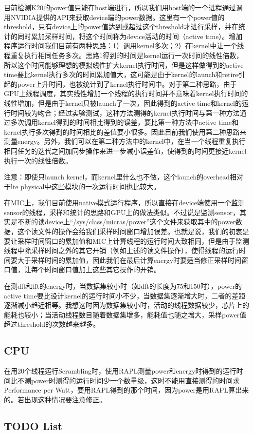 \documentclass[titlepage]{article}
\numberwithin{figure}{section}
\numberwithin{equation}{section}
\begin{document}
目前检测K20的power值只能在host端进行，所以我们用host端的一个进程通过调用NVIDIA提供的API来获取device端的power数据。这里有一个power值的threshold，只有device上的power值达到或超过这个threshold才进行采样，并在统计的同时累加采样时间，将这个时间称为device活动的时间（active time）。增加程序运行时间我们目前有两种思路：1）调用kernel多次；2）在kernel中让一个线程重复执行相同任务多次。思路1得到的时间是kernel运行一次时间的线性倍数，所以这个时间能够理想的模拟线性扩大kernel执行时间，但是这样做得到的active time要比kernel执行多次的时间累加值大，这可能是由于kernel的launch和retire引起的power上升时间，也被统计到了kernel执行时间中。对于第二种思路，由于GPU上线程调度，其实线性增加一个线程的执行时间并不意味着kernel执行时间的线性增加，但是由于kernel只被launch了一次，因此得到的active time和kernel的运行时间较为吻合；经过实验测试，这种方法测得的kernel执行时间与第一种方法通过多次调用kernel得到的时间相比得到的误差，要比第一种方法中active time和kernel执行多次得到的时间相比的差值要小很多。因此目前我们使用第二种思路来测量energy。另外，我们可以在第二种方法中的kernel中，在当一个线程重复执行相同任务的迭代之间加同步操作来进一步减小误差值，使得到的时间更接近kernel执行一次的线性倍数。

注意：即使只launch kernel，而kernel里什么也不做，这个launch的overhead相对于lte physical中这些模块的一次运行时间也比较大。

在MIC上，我们目前使用native模式运行程序，所以直接在device端使用一个监测sensor的线程，采样和统计的思路和GPU上的做法类似。不过说是监测sensor，其实是不断的读device上“/sys/class/micras/power”这个文件来获取其中的power数据，这个读文件的操作会给我们采样时间窗口增加误差。也就是说，我们的初衷是要让采样时间窗口的累加值和MIC上计算线程的运行时间大致相同，但是由于监测线程中除采样时间之外的其它开销（例如上述的读文件操作），使得线程的运行时间要大于采样时间的累加值，因此我们在最后计算energy时要适当修正采样时间窗口值，让每个时间窗口值加上这些其它操作的开销。

在测dft和fft的energy时，当数据集较小时（如dft的长度为75和150时），power的active time要比设计kernel的运行时间小不少，当数据集逐渐增大时，二者的差距逐渐减小趋近相等。我想这时因为数据集较小时，活动的线程数据较少，芯片上的能耗也较小；当活动线程数目随着数据集增多，能耗值也随之增大，采样power值超过threshold的次数越来越多。

\subsection{CPU}

在用20个线程运行Scrambling时，使用RAPL测量power和energy时得到的运行时间比不测power时测得的运行时间少一个数量级，这时不能用直接测得的时间求Performance per Watt，要用RAPL得到的那个时间，因为power是用RAPL算出来的。若出现这种情况要注意修正。

\subsection{TODO List}




\end{document}
